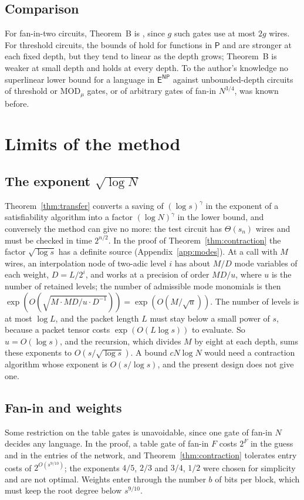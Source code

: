 \documentclass[11pt,reqno]{amsart}
\numberwithin{equation}{section}
\theoremstyle{plain}
\theoremstyle{definition}
\theoremstyle{remark}
\newcommand{\Pc}{\mathsf{P}}
\newcommand{\ENP}{\mathsf{E}^{\mathsf{NP}}}
\begin{document}
\subsection{Comparison}
For fan-in-two circuits, Theorem~B is \cite[Corollary 1.4]{OAI26}, since $g$
such gates use at most $2g$ wires. For threshold circuits, the bounds of
\cite{IPS97,KW16,CSS18} hold for functions in $\Pc$ and are stronger at each
fixed depth, but they tend to linear as the depth grows; Theorem~B is weaker at
small depth and holds at every depth. To the author's knowledge no superlinear
lower bound for a language in $\ENP$ against unbounded-depth circuits of
threshold or $\mathrm{MOD}_\mu$ gates, or of arbitrary gates of fan-in
$N^{3/4}$, was known before.

\section{Limits of the method}\label{sec:limits}

\subsection{The exponent $\sqrt{\log N}$}
Theorem~\ref{thm:transfer} converts a saving of $(\log s)^\gamma$ in the exponent
of a satisfiability algorithm into a factor $(\log N)^\gamma$ in the lower bound,
and conversely the method can give no more: the test circuit has $\Theta(s_n)$
wires and must be checked in time $2^{n/2}$. In the proof of
Theorem~\ref{thm:contraction} the factor $\sqrt{\log s}$ has a definite source
(Appendix~\ref{app:modes}). At a call with $M$ wires, an interpolation node of
two-adic level $i$ has about $M/D$ mode variables of each weight, $D=L/2^i$,
and works at a precision of order $MD/u$, where $u$ is the number of retained
levels; the number of admissible mode monomials is then
$\exp(O(\sqrt{M\cdot MD/u\cdot D^{-1}}))=\exp(O(M/\sqrt u))$. The number of
levels is at most $\log L$, and the packet length $L$ must stay below a small
power of $s$, because a packet tensor costs $\exp(O(L\log s))$ to evaluate.
So $u=O(\log s)$, and the recursion, which divides $M$ by eight at each depth,
sums these exponents to $O(s/\sqrt{\log s})$. A bound $cN\log N$ would need a contraction algorithm
whose exponent is $O(s/\log s)$, and the present design does not give one.

\subsection{Fan-in and weights}
Some restriction on the table gates is unavoidable, since one gate of fan-in
$N$ decides any language. In the proof, a table gate of fan-in $F$ costs $2^F$ in
the guess and in the entries of the network, and Theorem~\ref{thm:contraction}
tolerates entry costs of $2^{O(s^{9/10})}$; the exponents $4/5$, $2/3$ and $3/4$,
$1/2$ were chosen for simplicity and are not optimal. Weights enter through the
number $b$ of bits per block, which must keep the root degree below $s^{9/10}$.
\end{document}
